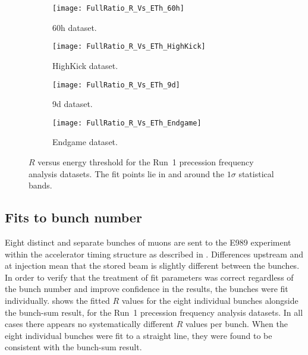\begin{figure}
\centering
    \begin{subfigure}[]{0.45\textwidth}
        \centering
        \texttt{[image: FullRatio\_R\_Vs\_ETh\_60h]}
        \caption{60h dataset.}
    \end{subfigure}%
    \begin{subfigure}[]{0.45\textwidth}
        \centering
        \texttt{[image: FullRatio\_R\_Vs\_ETh\_HighKick]}
        \caption{HighKick dataset.}
    \end{subfigure}

    \begin{subfigure}[]{0.45\textwidth}
        \centering
        \texttt{[image: FullRatio\_R\_Vs\_ETh\_9d]}
        \caption{9d dataset.}
    \end{subfigure}%
    \begin{subfigure}[]{0.45\textwidth}
        \centering
        \texttt{[image: FullRatio\_R\_Vs\_ETh\_Endgame]}
        \caption{Endgame dataset.}
    \end{subfigure}
\caption[$R$ versus energy threshold]{$R$ versus energy threshold for the Run~1 precession frequency analysis datasets. The fit points lie in and around the $1\sigma$ statistical bands.}
\label{fig:energyThresholdScan_R}
\end{figure}





\subsection{Fits to bunch number}

Eight distinct and separate bunches of muons are sent to the E989 experiment within the accelerator timing structure as described in . Differences upstream and at injection mean that the stored beam is slightly different between the bunches. In order to verify that the treatment of fit parameters was correct regardless of the bunch number and improve confidence in the results, the bunches were fit individually.  shows the fitted $R$ values for the eight individual bunches alongside the bunch-sum result, for the Run~1 precession frequency analysis datasets. In all cases there appears no systematically different $R$ values per bunch. When the eight individual bunches were fit to a straight line, they were found to be consistent with the bunch-sum result.


